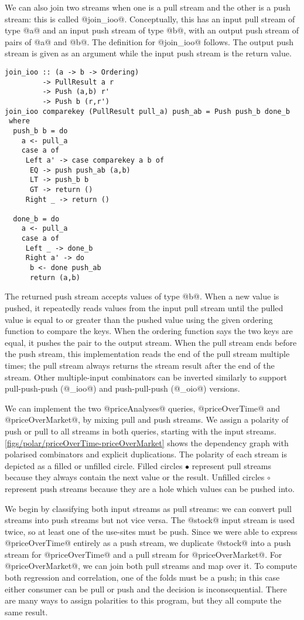 We can also join two streams when one is a pull stream and the other is a push stream: this is called @join_ioo@.
Conceptually, this has an input pull stream of type @a@ and an input push stream of type @b@, with an output push stream of pairs of @a@ and @b@.
The definition for @join_ioo@ follows.
The output push stream is given as an argument while the input push stream is the return value.

\begin{lstlisting}
join_ioo :: (a -> b -> Ordering)
         -> PullResult a r
         -> Push (a,b) r'
         -> Push b (r,r')
join_ioo comparekey (PullResult pull_a) push_ab = Push push_b done_b
 where
  push_b b = do
    a <- pull_a
    case a of
     Left a' -> case comparekey a b of
      EQ -> push push_ab (a,b)
      LT -> push_b b
      GT -> return ()
     Right _ -> return () 

  done_b = do
    a <- pull_a
    case a of
     Left _ -> done_b
     Right a' -> do
      b <- done push_ab
      return (a,b)
\end{lstlisting}

The returned push stream accepts values of type @b@.
When a new value is pushed, it repeatedly reads values from the input pull stream until the pulled value is equal to or greater than the pushed value using the given ordering function to compare the keys.
When the ordering function says the two keys are equal, it pushes the pair to the output stream.
When the pull stream ends before the push stream, this implementation reads the end of the pull stream multiple times; the pull stream always returns the stream result after the end of the stream.
Other multiple-input combinators can be inverted similarly to support pull-push-push (@_ioo@) and push-pull-push (@_oio@) versions.

We can implement the two @priceAnalyses@ queries, @priceOverTime@ and @priceOverMarket@, by mixing pull and push streams.
We assign a polarity of push or pull to all streams in both queries, starting with the input streams.
\autoref{figs/polar/priceOverTime-priceOverMarket} shows the dependency graph with polarised combinators and explicit duplications.
The polarity of each stream is depicted as a filled or unfilled circle.
Filled circles $\bullet$ represent pull streams because they always contain the next value or the result.
Unfilled circles $\circ$ represent push streams because they are a hole which values can be pushed into.

We begin by classifying both input streams as pull streams: we can convert pull streams into push streams but not vice versa.
The @stock@ input stream is used twice, so at least one of the use-sites must be push.
Since we were able to express @priceOverTime@ entirely as a push stream, we duplicate @stock@ into a push stream for @priceOverTime@ and a pull stream for @priceOverMarket@.
For @priceOverMarket@, we can join both pull streams and map over it.
To compute both regression and correlation, one of the folds must be a push; in this case either consumer can be pull or push and the decision is inconsequential.
There are many ways to assign polarities to this program, but they all compute the same result.

